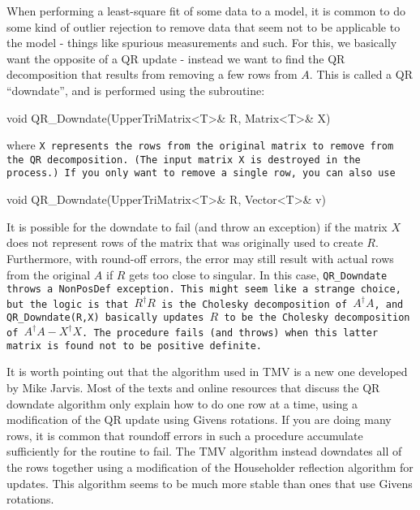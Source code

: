 When performing a least-square fit of some data to a model,
it is common to do some kind of outlier rejection to remove data that
seem not to be applicable to the model - things like spurious measurements
and such.
For this, we basically want the opposite of a QR update - instead we want to 
find the QR decomposition that results from
removing a few rows from $A$.  This is called a QR ``downdate'', and is performed
using the subroutine:
\begin{tmvcode}
void QR_Downdate(UpperTriMatrix<T>& R, Matrix<T>& X)
\end{tmvcode}
where \tt{X} represents the rows from the original matrix to remove from the 
QR decomposition.  (The input matrix \tt{X} is destroyed in the process.)  If you only want to
remove a single row, you can also use
\begin{tmvcode}
void QR_Downdate(UpperTriMatrix<T>& R, Vector<T>& v)
\end{tmvcode}

It is possible for the downdate to fail (and throw an exception) 
if the matrix $X$ does not represent rows
of the matrix that was originally used to create $R$.
Furthermore,
with round-off errors, the error may still result with actual rows from the 
original $A$
if $R$ gets too close to singular.  In this case, \tt{QR\_Downdate} throws
a \tt{NonPosDef} exception.  This might seem like a strange choice, but the 
logic is that $R^\dagger R$ is the Cholesky decomposition of $A^\dagger A$,
and \tt{QR\_Downdate(R,X)} basically updates $R$ to be the Cholesky decomposition
of $A^\dagger A - X^\dagger X$.  The procedure fails (and throws) when this latter 
matrix is found not to be positive definite.

It is worth pointing out that the algorithm used in TMV is a new one developed by
Mike Jarvis.  Most of the texts and online resources that discuss the 
QR downdate algorithm only explain how to do one row at a time, using a 
modification of the QR update using Givens rotations.  
If you are doing many rows, it is common that roundoff errors in such a 
procedure accumulate sufficiently for the routine to fail.  The TMV algorithm
instead downdates all of the rows together using a modification of the 
Householder reflection algorithm for updates.  This algorithm seems to be
much more stable than ones that use Givens rotations.  

